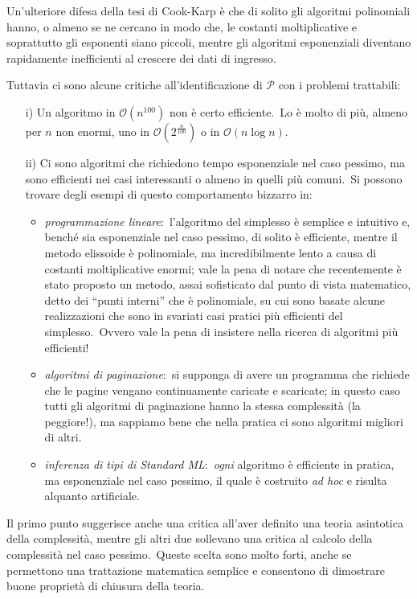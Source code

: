 \noindent Un'ulteriore difesa della tesi di Cook-Karp è che di solito gli algoritmi polinomiali hanno, o almeno se ne cercano in modo che, le costanti moltiplicative e soprattutto gli esponenti siano piccoli, mentre gli algoritmi esponenziali diventano rapidamente inefficienti al crescere dei dati di ingresso.\

Tuttavia ci sono alcune critiche all'identificazione di $\mathcal{P}$ con i problemi trattabili:
\begin{itemize}
    \item[i)] Un algoritmo in $\mathcal{O}\left(n^{100}\right)$ non è certo efficiente.\ Lo è molto di più, almeno per $n$ non enormi, uno in $\mathcal{O}\left(2^{\frac{n}{100}}\right)$ o in $\mathcal{O}(n\log n)$.
    \item[ii)] Ci sono algoritmi che richiedono tempo esponenziale nel caso pessimo, ma sono efficienti nei casi interessanti o almeno in quelli più comuni.\ Si possono trovare degli esempi di questo comportamento bizzarro in:
          \begin{itemize}
              \item \textit{programmazione lineare}:\ l'algoritmo del simplesso è semplice e intuitivo e, benché sia esponenziale nel caso pessimo, di solito è efficiente, mentre il metodo elissoide è polinomiale, ma incredibilmente lento a causa di costanti moltiplicative enormi; vale la pena di notare che recentemente è stato proposto un metodo, assai sofisticato dal punto di vista matematico, detto dei ``punti interni'' che è polinomiale, su cui sono basate alcune realizzazioni che sono in svariati casi pratici più efficienti del simplesso.\ Ovvero vale la pena di insistere nella ricerca di algoritmi più efficienti!
              \item \textit{algoritmi di paginazione}:\ si supponga di avere un programma che richiede che le pagine vengano continuamente caricate e scaricate; in questo caso tutti gli algoritmi di paginazione hanno la stessa complessità (la peggiore!), ma sappiamo bene che nella pratica ci sono algoritmi migliori di altri.
              \item \textit{inferenza di tipi di Standard ML}:\ \textit{ogni} algoritmo è efficiente in pratica, ma esponenziale nel caso pessimo, il quale è costruito \textit{ad hoc} e risulta alquanto artificiale.
          \end{itemize}
\end{itemize}

\noindent Il primo punto suggerisce anche una critica all'aver definito una teoria asintotica della complessità, mentre gli altri due sollevano una critica al calcolo della complessità nel caso pessimo.\
Queste scelta sono molto forti, anche se permettono una trattazione matematica semplice e consentono di dimostrare buone proprietà di chiusura della teoria.\

